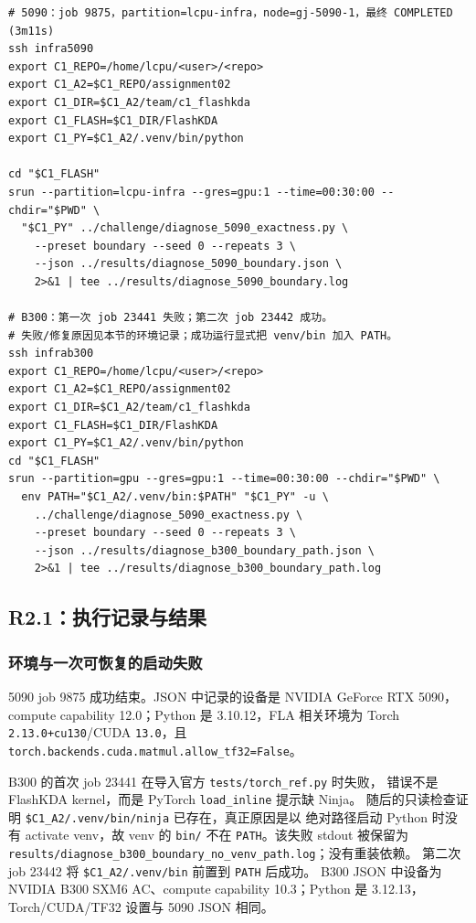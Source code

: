 \documentclass[11pt,a4paper,fontset=none]{ctexart}
\newcommand{\Fla}{\textsc{FLA}}
\newcommand{\code}[1]{\texttt{#1}}
\begin{document}
\begin{lstlisting}
# 5090：job 9875，partition=lcpu-infra，node=gj-5090-1，最终 COMPLETED (3m11s)
ssh infra5090
export C1_REPO=/home/lcpu/<user>/<repo>
export C1_A2=$C1_REPO/assignment02
export C1_DIR=$C1_A2/team/c1_flashkda
export C1_FLASH=$C1_DIR/FlashKDA
export C1_PY=$C1_A2/.venv/bin/python

cd "$C1_FLASH"
srun --partition=lcpu-infra --gres=gpu:1 --time=00:30:00 --chdir="$PWD" \
  "$C1_PY" ../challenge/diagnose_5090_exactness.py \
    --preset boundary --seed 0 --repeats 3 \
    --json ../results/diagnose_5090_boundary.json \
    2>&1 | tee ../results/diagnose_5090_boundary.log

# B300：第一次 job 23441 失败；第二次 job 23442 成功。
# 失败/修复原因见本节的环境记录；成功运行显式把 venv/bin 加入 PATH。
ssh infrab300
export C1_REPO=/home/lcpu/<user>/<repo>
export C1_A2=$C1_REPO/assignment02
export C1_DIR=$C1_A2/team/c1_flashkda
export C1_FLASH=$C1_DIR/FlashKDA
export C1_PY=$C1_A2/.venv/bin/python
cd "$C1_FLASH"
srun --partition=gpu --gres=gpu:1 --time=00:30:00 --chdir="$PWD" \
  env PATH="$C1_A2/.venv/bin:$PATH" "$C1_PY" -u \
    ../challenge/diagnose_5090_exactness.py \
    --preset boundary --seed 0 --repeats 3 \
    --json ../results/diagnose_b300_boundary_path.json \
    2>&1 | tee ../results/diagnose_b300_boundary_path.log
\end{lstlisting}

\subsection{R2.1：执行记录与结果}

\subsubsection{环境与一次可恢复的启动失败}

5090 job 9875 成功结束。JSON 中记录的设备是 NVIDIA GeForce RTX 5090，
compute capability 12.0；Python 是 3.10.12，\Fla{} 相关环境为
Torch \code{2.13.0+cu130}/CUDA \code{13.0}，且
\code{torch.backends.cuda.matmul.allow\_tf32=False}。

B300 的首次 job 23441 在导入官方 \code{tests/torch\_ref.py} 时失败，
错误不是 FlashKDA kernel，而是 PyTorch \code{load\_inline} 提示缺 Ninja。
随后的只读检查证明 \code{\$C1\_A2/.venv/bin/ninja} 已存在，真正原因是以
绝对路径启动 Python 时没有 activate venv，故 venv 的 \code{bin/} 不在
\code{PATH}。该失败 stdout 被保留为
\code{results/diagnose\_b300\_boundary\_no\_venv\_path.log}；没有重装依赖。
第二次 job 23442 将 \code{\$C1\_A2/.venv/bin} 前置到 \code{PATH} 后成功。
B300 JSON 中设备为 NVIDIA B300 SXM6 AC、compute capability 10.3；Python
是 3.12.13，Torch/CUDA/TF32 设置与 5090 JSON 相同。
\end{document}
